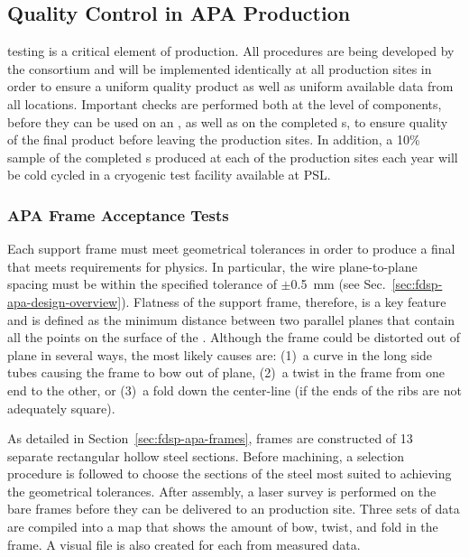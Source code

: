 \subsection{Quality Control in APA Production}
\label{sec:fdsp-apa-prod-qc}


 testing is a critical element of  production.  All  procedures are being developed by the consortium and will be implemented identically at all production sites in order to ensure a uniform quality product as well as uniform available data from all locations.  Important  checks are performed both at the level of components, before they can be used on an , as well as on the completed s, to ensure quality of the final product before leaving the production sites.  In addition, a 10\% sample of the completed s produced at each of the production sites each year will be cold cycled in a cryogenic test facility available at PSL.

\subsubsection{APA Frame Acceptance Tests} 

Each  support frame must meet geometrical tolerances in order to produce a final  that meets requirements for physics. In particular, the wire plane-to-plane spacing must be within the specified tolerance of $\pm$\SI{0.5}{mm} (see Sec.~\ref{sec:fdsp-apa-design-overview}).  Flatness of the support frame, therefore, is a key feature and is defined as the minimum distance between two parallel planes that contain all the points on the surface of the .  Although %
the frame could be distorted out of plane in several ways, the most likely causes are: %
(1)~a curve in the long side tubes causing the frame to bow out of plane, (2)~a twist in the frame from one end to the other, or (3)~a fold down the center-line (if the ends of the ribs are not adequately square).

As detailed in Section~\ref{sec:fdsp-apa-frames},  frames are constructed of 13 separate rectangular hollow steel sections.  Before machining, a selection procedure is followed to choose the sections of the steel most suited to achieving the geometrical tolerances.  After assembly, a laser survey is performed on the bare frames before they can be delivered to an  production site. Three sets of data are compiled into a map that shows the amount of bow, twist, and fold in the frame. A visual file is also created for each  from measured data. 

